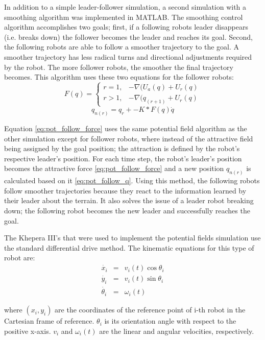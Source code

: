 In addition to a simple leader-follower simulation, a second simulation with a smoothing algorithm was implemented in MATLAB. The smoothing control algorithm accomplishes two goals; first, if a following robots leader disappears (i.e. breaks down) the follower becomes the leader and reaches its goal. Second, the following robots are able to follow a smoother trajectory to the goal. A smoother trajectory has less radical turns and directional adjustments required by the robot. The more follower robots, the smoother the final trajectory becomes. This algorithm uses these two equations for the follower robots:
\begin{equation} \label{eq:pot_follow_force}
	F(q) =
	\begin{cases}
		r=1, & -\nabla(U_a(q)+U_r(q) \\
		r>1, & -\nabla(q_{(r+1)}+U_r(q)
	\end{cases}
\end{equation}
\begin{equation} \label{eq:pot_follow_q}
	q_{n(r)}=q_r+-K*F(q)\dot{q}
\end{equation}

Equation \eqref{eq:pot_follow_force} uses the same potential field algorithm as the other simulation except for follower robots, where instead of the attractive field being assigned by the goal position; the attraction is defined by the robot's respective leader's position. For each time step, the robot's leader's position becomes the attractive force \eqref{eq:pot_follow_force} and a new position $q_{n(r)}$ is calculated based on it \eqref{eq:pot_follow_q}. Using this method, the following robots follow smoother trajectories because they react to the information learned by their leader about the terrain. It also solves the issue of a leader robot breaking down; the following robot becomes the new leader and successfully reaches the goal.

The Khepera III's that were used to implement the potential fields simulation use the standard differential drive method. The kinematic equations for this type of robot are:
\begin{eqnarray} \label{eq:diff_drive}
	\dot{x_i} &=& v_i(t)\cos\theta_i\\
	\dot{y_i} &=& v_i(t)\sin\theta_i\\
	\dot{\theta_i} &=& \omega_i(t)
\end{eqnarray}

where $(x_i,y_i)$ are the coordinates of the reference point of i-th robot in the Cartesian frame of reference. $\theta_i$ is its orientation angle with respect to the positive x-axis. $v_i$ and $\omega_i(t)$ are the linear and angular velocities, respectively.

